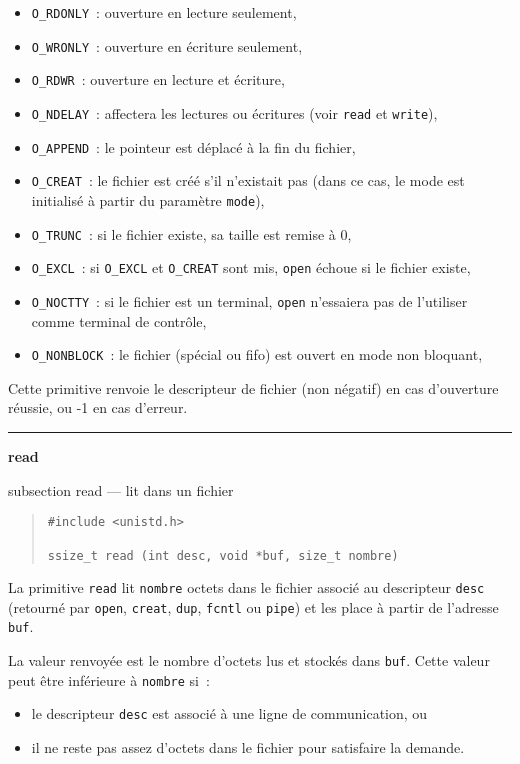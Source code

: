 \documentclass [twoside] {report}
\newcommand {\primitive} [1]
    {
	\phantomsection
	{\large \textbf {#1}}
	\addcontentsline {toc} {subsection} {#1}
    }
\newcommand {\separation}
    {
	\vspace {5mm}
	\nopagebreak
	\hrule
    }
\begin{document}
\begin {itemize}
    \item \texttt {O\_RDONLY}~: ouverture en lecture seulement,
    \item \texttt {O\_WRONLY}~: ouverture en écriture seulement,
    \item \texttt {O\_RDWR}~: ouverture en lecture et écriture,
    \item \texttt {O\_NDELAY}~: affectera les lectures ou
	écritures (voir \texttt {read} et \texttt {write}),
    \item \texttt {O\_APPEND}~: le pointeur est déplacé à la fin du fichier,
    \item \texttt {O\_CREAT}~: le fichier est créé s'il n'existait pas
	(dans ce cas, le mode est initialisé à partir du paramètre \texttt {mode}),
    \item \texttt {O\_TRUNC}~: si le fichier existe, sa taille est remise à 0,
    \item \texttt {O\_EXCL}~: si \texttt {O\_EXCL} et \texttt {O\_CREAT} sont mis,
	\texttt {open} échoue si le fichier existe,
    \item \texttt {O\_NOCTTY}~: si le fichier est un terminal, \texttt {open}
	n'essaiera pas de l'utiliser comme terminal de contrôle,
    \item \texttt {O\_NONBLOCK}~: le fichier (spécial ou fifo) est ouvert en
	mode non bloquant,
\end {itemize}

Cette primitive renvoie le descripteur de fichier
(non négatif) en cas d'ouverture
réussie, ou -1 en cas d'erreur.




\separation
\primitive {read} --- lit dans un fichier

\begin {quote}
\begin {verbatim}
#include <unistd.h>

ssize_t read (int desc, void *buf, size_t nombre)
\end{verbatim}
\end {quote}

La primitive \texttt {read} lit \texttt {nombre} octets dans
le fichier associé au descripteur \texttt {desc}
(retourné par \texttt {open}, \texttt {creat}, \texttt {dup}, \texttt {fcntl}
ou \texttt {pipe}) et les place à partir de l'adresse
\texttt {buf}.

La valeur renvoyée est le nombre d'octets lus et
stockés dans \texttt {buf}. Cette valeur peut être
inférieure à \texttt {nombre} si~:
\begin {itemize}
    \item le descripteur \texttt {desc} est associé à une ligne
	de communication, ou
    \item il ne reste pas assez d'octets dans le fichier
	pour satisfaire la demande.
\end {itemize}
\end{document}
